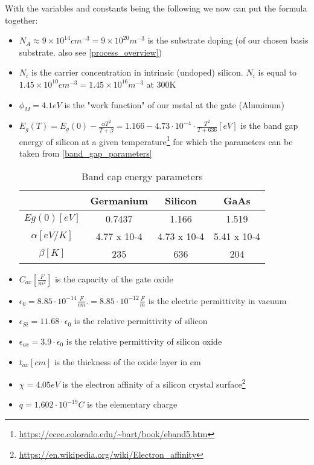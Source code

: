 With the variables and constants being the following we now can put the formula together:
\begin{itemize}
\item $N_A \approx 9\times10^{14}cm^{-3} = 9\times10^{20}m^{-3}$ is the substrate doping (of our chosen basis substrate. also see \autoref{process_overview})
\item $N_i$ is the carrier concentration in intrinsic (undoped) silicon. $N_i$ is equal to $1.45 \times 10^{10} cm^{-3} = 1.45 \times 10^{16} m^{-3}$ at 300\degree K
\item $\phi_M = 4.1 eV$ is the "work function" of our metal at the gate (Aluminum)
\item $E_g(T) = E_g(0) - \frac{\alpha T^2}{T+\beta} = 1.166 - 4.73 \cdot 10^{-4} \cdot \frac{T^2}{T+636} [eV]$ is the band gap energy of silicon at a given temperature\footnote{\url{https://ecee.colorado.edu/~bart/book/eband5.htm}} for which the parameters can be taken from \autoref{band_gap_parameters}
\begin{table}[H]
\centering
\begin{tabular}{|c|c|c|c|}
\hline
{} &
\textbf{Germanium} &
\textbf{Silicon} &
\textbf{GaAs} \\
\hline
$Eg(0) [eV]$ &
0.7437 &
1.166 &
1.519 \\
\hline
$\alpha [eV/K]$ &
4.77 x 10-4 &
4.73 x 10-4 &
5.41 x 10-4 \\
\hline
$\beta [K]$ &
235 &
636 &
204 \\
\hline
\end{tabular}
\caption{Band cap energy parameters}
\label{band_gap_parameters}
\end{table}
\item $C_{ox} \left[\frac{F}{m^2}\right]$ is the capacity of the gate oxide
\item $\epsilon_0 = 8.85 \cdot 10^{-14} \frac{F}{cm}.= 8.85 \cdot 10^{-12} \frac{F}{m} $ is the electric permittivity in vacuum
\item $\epsilon_{Si} =11.68 \cdot \epsilon_0$ is the relative permittivity of silicon
\item $\epsilon_{ox} = 3.9 \cdot \epsilon_0$ is the relative permittivity of silicon oxide
\item $t_{ox} [cm]$ is the thickness of the oxide layer in cm
\item $\chi = 4.05 eV$ is the electron affinity of a silicon crystal surface\footnote{\url{https://en.wikipedia.org/wiki/Electron_affinity}}
\item $q=1.602 \cdot 10^{-19} C$ is the elementary charge
\end{itemize} 
 
